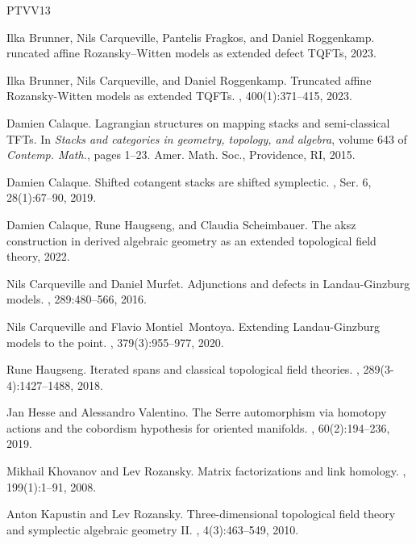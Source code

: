 \documentclass{amsart}
\theoremstyle{definition}
\theoremstyle{theorem}
\theoremstyle{theorem}
\numberwithin{equation}{subsection}
\begin{document}
\begin{thebibliography}{PTVV13}

Ilka Brunner, Nils Carqueville, Pantelis Fragkos, and Daniel Roggenkamp.
runcated affine {R}ozansky--{W}itten models as extended defect {TQFT}s, 2023.

Ilka Brunner, Nils Carqueville, and Daniel Roggenkamp.
\newblock Truncated affine {R}ozansky-{W}itten models as extended {TQFT}s.
, 400(1):371--415, 2023.

Damien Calaque.
\newblock Lagrangian structures on mapping stacks and semi-classical {TFT}s.
\newblock In {\em Stacks and categories in geometry, topology, and algebra}, volume 643 of {\em Contemp. Math.}, pages 1--23. Amer. Math. Soc., Providence, RI, 2015.

Damien Calaque.
\newblock Shifted cotangent stacks are shifted symplectic.
, Ser. 6, 28(1):67--90, 2019.

Damien Calaque, Rune Haugseng, and Claudia Scheimbauer.
\newblock The aksz construction in derived algebraic geometry as an extended topological field theory, 2022.

Nils Carqueville and Daniel Murfet.
\newblock Adjunctions and defects in {L}andau-{G}inzburg models.
, 289:480--566, 2016.

Nils Carqueville and Flavio Montiel~Montoya.
\newblock Extending {L}andau-{G}inzburg models to the point.
, 379(3):955--977, 2020.

Rune Haugseng.
\newblock Iterated spans and classical topological field theories.
, 289(3-4):1427--1488, 2018.

Jan Hesse and Alessandro Valentino.
\newblock The {S}erre automorphism via homotopy actions and the cobordism hypothesis for oriented manifolds.
, 60(2):194--236, 2019.

Mikhail Khovanov and Lev Rozansky.
\newblock Matrix factorizations and link homology.
, 199(1):1--91, 2008.

Anton Kapustin and Lev Rozansky.
\newblock Three-dimensional topological field theory and symplectic algebraic geometry {II}.
, 4(3):463--549, 2010.


\end{thebibliography}
\end{document}
